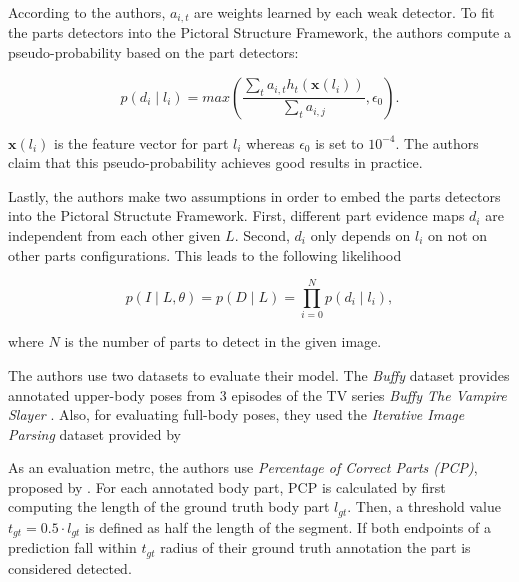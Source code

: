 According to the authors, $a_{i,t}$ are weights learned by each weak detector.
To fit the parts detectors into the Pictoral Structure Framework, the authors compute a pseudo-probability based on the part detectors:

\begin{equation}
    p(d_i \mid l_i) = max \left(\frac{\sum_t a_{i,t} h_t(\bm{x}(l_i))}{\sum_t a_{i,j}}, \epsilon_0 \right).
\end{equation}

$\bm{x}(l_i)$ is the feature vector for part $l_i$ whereas $\epsilon_0$ is set to $10^{-4}$.
The authors claim that this pseudo-probability achieves good results in practice.

Lastly, the authors make two assumptions in order to embed the parts detectors into the Pictoral Structute Framework.
First, different part evidence maps $d_i$ are independent from each other given $L$.
Second, $d_i$ only depends on $l_i$ on not on other parts configurations.
This leads to the following likelihood

\begin{equation}
    p(I \mid L, \theta) = p(D \mid L) = \prod_{i=0}^N p(d_i \mid l_i),
\end{equation}

where $N$ is the number of parts to detect in the given image.

\label{sec:andriluka-eval}
The authors use two datasets to evaluate their model.
The \textit{Buffy} dataset provides annotated upper-body poses from $3$ episodes of the TV series \textit{Buffy The Vampire Slayer} \cite{ferrari_progressive_2008}.
Also, for evaluating full-body poses, they used the \textit{Iterative Image Parsing} dataset provided by \cite{ramanan_learning_2007}

As an evaluation metrc, the authors use \textit{Percentage of Correct Parts (PCP)}, proposed by \cite{ferrari_progressive_2008}.
For each annotated body part, PCP is calculated by first computing the length of the ground truth body part $l_{gt}$.
Then, a threshold value $t_{gt} = 0.5 \cdot l_{gt}$ is defined as half the length of the segment.
If both endpoints of a prediction fall within $t_{gt}$ radius of their ground truth annotation the part is considered detected.

